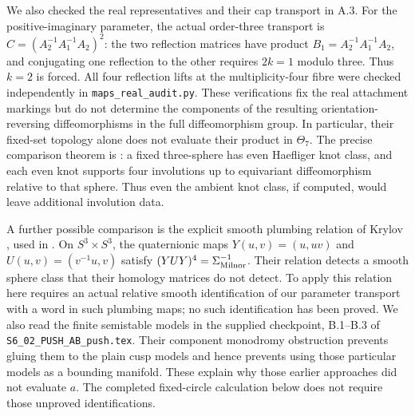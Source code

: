 We also checked the real representatives and their cap transport in
A.3. For the positive-imaginary parameter, the actual order-three
transport is $C=(A_2^{-1}A_1^{-1}A_2)^2$: the two reflection matrices
have product $B_1=A_2^{-1}A_1^{-1}A_2$, and conjugating one reflection
to the other requires $2k=1$ modulo three. Thus $k=2$ is forced.
All four reflection lifts at the multiplicity-four fibre were checked
independently in \texttt{maps\_real\_audit.py}. These verifications
fix the real attachment markings but do not determine the components
of the resulting orientation-reversing diffeomorphisms in the full
diffeomorphism group. In particular, their fixed-set topology alone
does not evaluate their product in $\Theta_7$.
The precise comparison theorem is
\cite[Theorem 1.3]{mapsOlbermann10}: a fixed three-sphere has even
Haefliger knot class, and each even knot supports four involutions up
to equivariant diffeomorphism relative to that sphere. Thus even the
ambient knot class, if computed, would leave additional involution data.

A further possible comparison is the explicit smooth plumbing
relation of Krylov \cite[Theorem 3]{mapsKrylov03}, used in
\cite[Theorem 4.1]{mapsRandalWilliams25}. On $S^3\times S^3$, the
quaternionic maps $Y(u,v)=(u,uv)$ and $U(u,v)=(v^{-1}u,v)$ satisfy
$(YUY)^4=\Sigma_{\rm Milnor}^{-1}$. Their relation detects a smooth
sphere class that their homology matrices do not detect. To apply
this relation here requires an actual relative smooth identification
of our parameter transport with a word in such plumbing maps; no such
identification has been proved. We also read the finite semistable
models in the supplied checkpoint, B.1--B.3 of
\texttt{S6\_02\_PUSH\_AB\_push.tex}. Their component monodromy
obstruction prevents gluing them to the plain cusp models and hence
prevents using those particular models as a bounding manifold.
These explain why those earlier approaches did not evaluate $a$.
The completed fixed-circle calculation below does not require those
unproved identifications.

